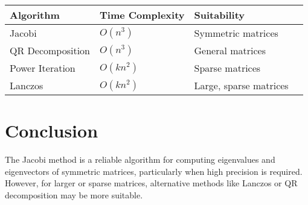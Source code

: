 \documentclass[journal]{IEEEtran}
\begin{document}
\begin{tabular}{|l|l|l|l|}
\hline
\textbf{Algorithm} & \textbf{Time Complexity} & \textbf{Suitability}  \\ \hline
Jacobi & $O(n^3)$ & Symmetric matrices \\ \hline
QR Decomposition & $O(n^3)$ & General matrices \\ \hline
Power Iteration & $O(kn^2)$ & Sparse matrices \\ \hline
Lanczos & $O(kn^2)$ & Large, sparse matrices \\ \hline
\end{tabular}

\section*{\textbf{Conclusion}}

The Jacobi method is a reliable algorithm for computing eigenvalues and eigenvectors of symmetric matrices, particularly when high precision is required. However, for larger or sparse matrices, alternative methods like Lanczos or QR decomposition may be more suitable.
\end{document}

